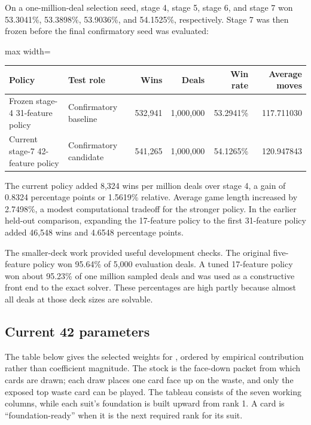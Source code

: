 \documentclass[11pt]{article}
\begin{document}
On a one-million-deal selection seed, stage 4, stage 5, stage 6, and stage 7 won 53.3041\%, 53.3898\%, 53.9036\%, and 54.1525\%, respectively. Stage 7 was then frozen before the final confirmatory seed was evaluated:

\begin{center}
\begin{adjustbox}{max width=\textwidth}
\begin{tabular}{@{}l l r r r r@{}}
\toprule
\textbf{Policy} & \textbf{Test role} & \textbf{Wins} & \textbf{Deals} & \textbf{Win rate} & \textbf{Average moves} \\
\midrule
Frozen stage-4 31-feature policy & Confirmatory baseline & 532,941 & 1,000,000 & 53.2941\% & 117.711030 \\
Current stage-7 42-feature policy & Confirmatory candidate & 541,265 & 1,000,000 & 54.1265\% & 120.947843 \\
\bottomrule
\end{tabular}
\end{adjustbox}
\end{center}

The current policy added 8,324 wins per million deals over stage 4, a gain of 0.8324 percentage points or 1.5619\% relative. Average game length increased by 2.7498\%, a modest computational tradeoff for the stronger policy. In the earlier held-out comparison, expanding the 17-feature policy to the first 31-feature policy added 46,548 wins and 4.6548 percentage points.

The smaller-deck work provided useful development checks. The original five-feature policy won 95.64\% of 5,000 \texttt{} evaluation deals. A tuned 17-feature \texttt{} policy won about 95.23\% of one million sampled deals and was used as a constructive front end to the exact solver. These percentages are high partly because almost all deals at those deck sizes are solvable.

\subsection{Current 42 parameters}

The table below gives the selected weights for \texttt{}, ordered by empirical contribution rather than coefficient magnitude. The stock is the face-down packet from which cards are drawn; each draw places one card face up on the waste, and only the exposed top waste card can be played. The tableau consists of the seven working columns, while each suit's foundation is built upward from rank 1. A card is ``foundation-ready'' when it is the next required rank for its suit.
\end{document}
